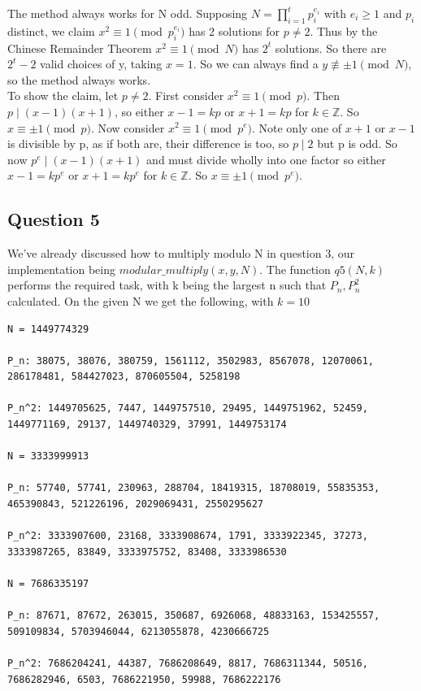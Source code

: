 \documentclass[10pt,a4paper]{report}
\begin{document}
The method always works for N odd. Supposing $N=\prod_{i=1}^t p_i^{e_i}$ with $e_i\geq1$ and $p_i$ distinct, we claim $x^2 \equiv 1 \pmod{p_i^{e_i}}$ has 2 solutions for $p\neq2$. Thus by the Chinese Remainder Theorem $x^2\equiv 1 \pmod N$ has $2^t$ solutions. So there are $2^t-2$ valid choices of y, taking $x=1$. So we can always find a $y\not\equiv \pm1 \pmod N$, so the method always works.\\

To show the claim, let $p\neq2$. First consider $x^2\equiv 1 \pmod p$. Then $p \mid (x-1)(x+1)$, so either $x-1=kp$ or $x+1=kp$ for $k\in\mathbb{Z}$. So $x\equiv\pm 1 \pmod p$. Now consider $x^2\equiv 1 \pmod{p^e}$. Note only one of $x+1$ or $x-1$ is divisible by p, as if both are, their difference is too, so $p \mid 2$ but p is odd. So now $p^e \mid (x-1)(x+1)$ and must divide wholly into one factor so either $x-1=kp^e$ or $x+1=kp^e$ for $k\in\mathbb{Z}$. So $x\equiv\pm 1 \pmod{p^e}$.

\subsection*{Question 5}

We've already discussed how to multiply modulo N in question 3, our implementation being $modular\_multiply(x,y,N)$. The function $q5(N,k)$ performs the required task, with k being the largest n such that $P_n, P_n^2$ calculated. On the given N we get the following, with $k=10$


\begin{lstlisting}[breaklines]	
N = 1449774329

P_n: 38075, 38076, 380759, 1561112, 3502983, 8567078, 12070061, 286178481, 584427023, 870605504, 5258198

P_n^2: 1449705625, 7447, 1449757510, 29495, 1449751962, 52459, 1449771169, 29137, 1449740329, 37991, 1449753174

N = 3333999913

P_n: 57740, 57741, 230963, 288704, 18419315, 18708019, 55835353, 465390843, 521226196, 2029069431, 2550295627

P_n^2: 3333907600, 23168, 3333908674, 1791, 3333922345, 37273, 3333987265, 83849, 3333975752, 83408, 3333986530

N = 7686335197

P_n: 87671, 87672, 263015, 350687, 6926068, 48833163, 153425557, 509109834, 5703946044, 6213055878, 4230666725

P_n^2: 7686204241, 44387, 7686208649, 8817, 7686311344, 50516, 7686282946, 6503, 7686221950, 59988, 7686222176
\end{lstlisting}
\end{document}
